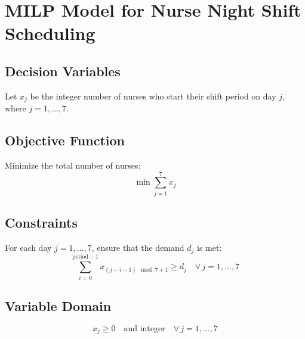 \documentclass{article}
\begin{document}
\section*{MILP Model for Nurse Night Shift Scheduling}

\subsection*{Decision Variables}
Let \( x_j \) be the integer number of nurses who start their shift period on day \( j \), where \( j = 1, \ldots, 7 \).

\subsection*{Objective Function}
Minimize the total number of nurses:
\[
\min \sum_{j=1}^{7} x_j
\]

\subsection*{Constraints}
For each day \( j = 1, \ldots, 7 \), ensure that the demand \( d_j \) is met:
\[
\sum_{i=0}^{\text{period} - 1} x_{(j-i-1) \mod 7 + 1} \geq d_j \quad \forall \, j = 1, \ldots, 7
\]

\subsection*{Variable Domain}
\[
x_j \geq 0 \quad \text{and integer} \quad \forall \, j = 1, \ldots, 7
\]
\end{document}
